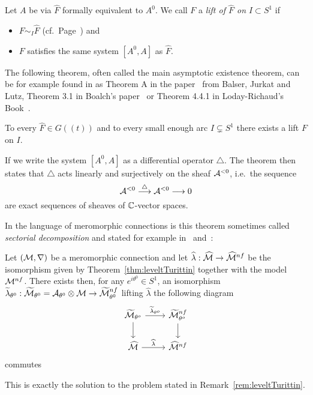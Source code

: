 \begin{defn}\label{defn:lift}
  Let $A$ be via $\hat F$ formally equivalent to $A^0$.
  We call $F$ a \emph{lift of $\hat F$ on $I\subset S^1$} if
  \begin{itemize}
    \item $F\sim_I\hat F$
      (cf.\ Page~\pageref{page:notationForAsymptoticExpansion}) and
    \item $F$ satisfies the same system $[A^0,A]$ as $\hat F$.
  \end{itemize}
\end{defn}
The following theorem, often called the main asymptotic existence theorem, can
be for example found in as Theorem A in the paper~\cite{BJL1979Birkhoff} from
Balser, Jurkat and Lutz, Theorem 3.1 in Boalch's paper~\cite{boalch}
or Theorem 4.4.1 in Loday-Richaud's Book~\cite{Loday2014}.
\begin{thm}[M.A.E.T]\label{thm:maet}
  To every $\hat F\in G(\!(t)\!)$ and to every small enough arc
  $I\subsetneq S^1$ there exists a lift $F$ on $I$.
  \begin{s-rem}
    If we write the system $[A^0,A]$ as a differential operator $\triangle$.
    The theorem then states that $\triangle$ acts linearly and surjectively on
    the sheaf $\mathcal{A}^{<0}$, i.e.\ the sequence
    \[
      \mathcal{A}^{<0}\overset{\triangle}\longrightarrow\mathcal{A}^{<0} \longrightarrow 0
    \]
    are exact sequences of sheaves of $\mathbb{C}$-vector spaces.
    \begin{comment}
      (cf.~\cite[App.1;Thm.1]{malgrange1991})
    \end{comment}
  \end{s-rem}
\end{thm}
\begin{rem}
  In the language of meromorphic connections is this theorem sometimes called
  \emph{sectorial decomposition} and stated for example
  in~\cite[Thm.II.5.12]{sabbah2007isomonodromic}
  and~\cite[Sec.II.2.4]{sabbah_cimpa90}:
  \begin{s-thm}\label{thm:sectorialDecompFromMAET}
    Let $(\mathcal{M},\nabla)$ be a meromorphic connection and let
    $\widehat\lambda:\widehat{\mathcal{M}}\to\widehat{\mathcal{M}}^{nf}$ be the isomorphism given by
    Theorem~\ref{thm:leveltTurittin} together with the model $\mathcal{M}^{nf}$.
    There exists then, for any $e^{i\theta^0}\in S^1$, an isomorphism
    $\widetilde\lambda_{\theta^0}:
    \widetilde{\mathcal{M}}_{\theta^0}=\mathcal{A}_{\theta^0}\otimes\mathcal{M}\to\widetilde{\mathcal{M}}_{\theta^0}^{nf}$
    lifting $\hat\lambda$  the following diagram
    \[ \begin{tikzcd}
        \tilde\cM_{\theta^o} \dar \rar{\tilde\lambda_{\theta^o}}
        & \tilde\cM^{nf}_{\theta^o} \dar
        \\\hat\cM \rar{\hat\lambda}
        & \hat\cM^{nf}
    \end{tikzcd} \]
    commutes
  \end{s-thm}
  This is exactly the solution to the problem stated in
  Remark~\ref{rem:leveltTurittin}.
\end{rem}

